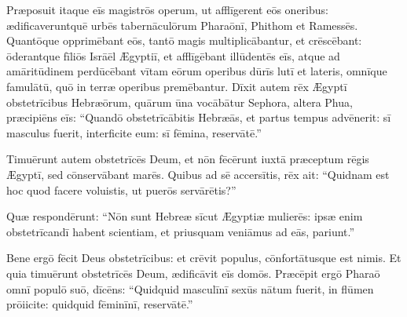 Præposuit itaque eīs magistrōs operum, ut afflīgerent eōs  oneribus: 
ædificaveruntquē urbēs tabernāculōrum Pharaōnī, Phithom et Ramessēs.
Quantōque opprimēbant eōs, tantō magis multiplicābantur, et crēscēbant: 
ōderantque fīliōs Isrāēl Ægyptiī, et afflīgēbant illūdentēs eīs,
atque ad amāritūdinem perdūcēbant vītam eōrum operibus dūrīs lutī et lateris, omnīque famulātū, quō in terræ operibus premēbantur. 
Dīxit autem rēx Ægyptī  obstetrīcibus Hebræōrum, quārum ūna vocābātur Sephora, altera Phua, 
 præcipiēns eīs: ``Quandō obstetrīcābitis Hebræās, et  partus tempus advēnerit: sī masculus fuerit, interficite eum: sī fēmina, reservātē.''

Timuērunt autem obstetrīcēs Deum, et nōn fēcērunt iuxtā præceptum rēgis Ægyptī, sed cōnservābant marēs. 
Quibus ad sē accersītis, rēx ait: ``Quidnam est hoc quod facere voluistis, ut puerōs servārētis?''

Quæ respondērunt: ``Nōn sunt Hebreæ sīcut Ægyptiæ mulierēs: ipsæ enim obstetrīcandī habent scientiam, et priusquam veniāmus ad eās, pariunt.''

Bene ergō fēcit Deus obstetrīcibus: et crēvit populus, cōnfortātusque est nimis.
Et quia timuērunt obstetrīcēs Deum, ædificāvit eīs domōs.
Præcēpit ergō Pharaō omnī populō suō, dīcēns: ``Quidquid masculīnī sexūs nātum fuerit, in flūmen prōiicite: quidquid fēminīnī, reservātē.''
